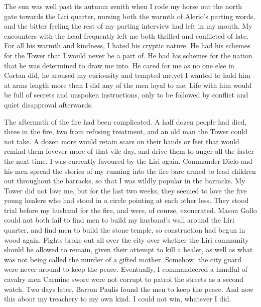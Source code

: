 \documentclass{article}
\begin{document}
The sun was well past its autumn zenith when I rode my horse out the north gate towards the Liri quarter, nursing both the warmth of Alerio's parting words, and the bitter feeling the rest of my parting interview had left in my mouth. My encounters with the head frequently left me both thrilled and conflicted of late. For all his warmth and kindness, I hated his cryptic nature. He had his schemes for the Tower that I would never be a part of. He had his schemes for the nation that he was determined to draw me into. He cared for me as no one else in Cortan did, he aroused my curiousity and tempted me,yet I wanted to hold him at arms length more than I did any of the men loyal to me. Life with him would be full of secrets and unspoken instructions, only to be followed by conflict and quiet disapproval afterwards. 

The aftermath of the fire had been complicated. A half dozen people had died, three in the fire, two from refusing treatment, and an old man the Tower could not take. A dozen more would retain scars on their hands or feet that would remind them fovever more of that vile day, and drive them to anger all the faster the next time. I was currently favoured by the Liri again. Commander Dielo and his men spread the stories of my running into the fire bare armed to lead children out throughout the barracks, so that I was wildly popular in the barracks. My Tower did not love me, but for the last two weeks, they seemed to love the five young healers who had stood in a circle pointing at each other less. They stood trial before my husband for the fire, and were, of course, exonerated. Mason Gallo could not both fail to find men to build my husband's wall around the Liri quarter, and find men to build the stone temple, so construction had begun in wood again. Fights broke out all over the city over whether the Liri community should be allowed to remain, given their attempt to kill a healer, as well as what was not being called the murder of a gifted mother. Somehow, the city guard were never around to keep the peace. Eventually, I commandeered a handful of cavalry men Carmine swore were not corrupt to patrol the streets as a second watch. Two days later, Barron Paulis found the men to keep the peace. And now this about my treachery to my own kind. I could not win, whatever I did. 
\end{document}
